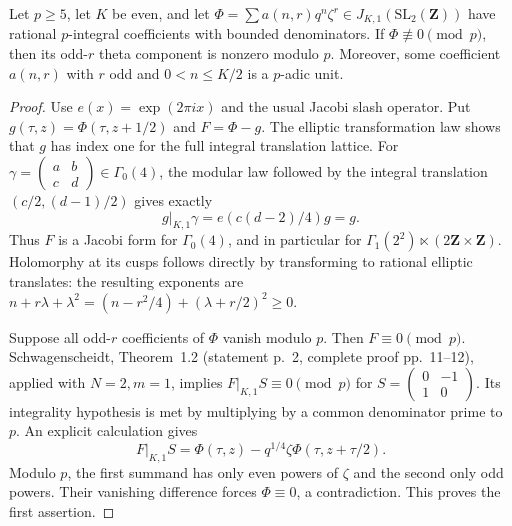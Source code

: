 \begin{lemma}
Let $p\geq5$, let $K$ be even, and let
$\Phi=\sum a(n,r)q^n\zeta^r\in J_{K,1}(\mathrm{SL}_2(\mathbf Z))$
have rational $p$-integral coefficients with bounded denominators.
If $\Phi\not\equiv0\pmod p$, then its odd-$r$ theta component is
nonzero modulo $p$.  Moreover, some coefficient $a(n,r)$ with $r$ odd
and $0<n\leq K/2$ is a $p$-adic unit.
\end{lemma}
\begin{proof}
Use $e(x)=\exp(2\pi i x)$ and the usual Jacobi slash operator.
Put $g(\tau,z)=\Phi(\tau,z+1/2)$ and $F=\Phi-g$.
The elliptic transformation law shows that $g$ has index one for
the full integral translation lattice.  For
$\gamma=\left(\begin{smallmatrix}a&b\\c&d\end{smallmatrix}\right)
\in\Gamma_0(4)$, the modular law followed by the integral translation
$(c/2,(d-1)/2)$ gives exactly
\[
                   g|_{K,1}\gamma=e(c(d-2)/4)g=g.       \tag{JF.2}
\]
Thus $F$ is a Jacobi form for $\Gamma_0(4)$, and in particular for
$\Gamma_1(2^2)\ltimes(2\mathbf Z\times\mathbf Z)$.
Holomorphy at its cusps follows directly by transforming to rational
elliptic translates: the resulting exponents are
$n+r\lambda+\lambda^2=(n-r^2/4)+(\lambda+r/2)^2\geq0$.

Suppose all odd-$r$ coefficients of $\Phi$ vanish modulo $p$.
Then $F\equiv0\pmod p$.  Schwagenscheidt, Theorem~1.2
(statement p.~2, complete proof pp.~11--12), applied with $N=2,m=1$,
implies $F|_{K,1}S\equiv0\pmod p$ for
$S=\left(\begin{smallmatrix}0&-1\\1&0\end{smallmatrix}\right)$.
Its integrality hypothesis is met by multiplying by a common
denominator prime to $p$.  An explicit calculation gives
\[
 F|_{K,1}S=\Phi(\tau,z)
       -q^{1/4}\zeta\Phi(\tau,z+\tau/2).                \tag{JF.3}
\]
Modulo $p$, the first summand has only even powers of $\zeta$ and
the second only odd powers.  Their vanishing difference forces
$\Phi\equiv0$, a contradiction.  This proves the first assertion.


\end{proof}
